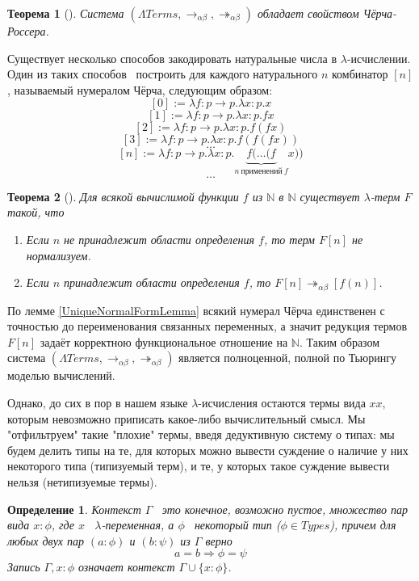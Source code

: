 \documentclass{article}[14pt]
\newtheorem{theorem}{Теорема}
\newtheorem{definition}{Определение}
\newcommand{\dash}{\textemdash\ }
\begin{document}
\begin{theorem}[\cite{SorUrz06}]
    Система $(\Lambda Terms, \rightarrow_{\alpha \beta}, \twoheadrightarrow_{\alpha \beta})$ обладает
    свойством Чёрча-Россера.
\end{theorem}

Существует несколько способов закодировать натуральные числа в $\lambda$-исчислении. Один из таких
способов \dash построить для каждого натурального $n$ комбинатор $[n]$, называемый нумералом Чёрча,
следующим образом:
$$[0] := \lambda f : p \rightarrow p . \lambda x : p . x$$
$$[1] := \lambda f : p \rightarrow p . \lambda x : p . fx$$
$$[2] := \lambda f : p \rightarrow p . \lambda x : p . f (fx)$$
$$[3] := \lambda f : p \rightarrow p . \lambda x : p . f (f (fx))$$
$$ \dots $$
$$[n] := \lambda f : p \rightarrow p. \lambda x : p . \underbrace{f(\dots (f}_{n\ \text{применений}\ f} x))$$
$$ \dots $$

\begin{theorem}[\cite{SorUrz06}]
    Для всякой вычислимой функции $f$ из $\mathbb{N}$ в $\mathbb{N}$ существует
    $\lambda$-терм $F$ такой, что
    \begin{enumerate}
        \item Если $n$ не принадлежит области определения $f$, то терм $F[n]$ не нормализуем.
        \item Если $n$ принадлежит области определения $f$, то $F[n] \twoheadrightarrow_{\alpha \beta} [f(n)]$.
    \end{enumerate}
\end{theorem}

По лемме \ref{UniqueNormalFormLemma} всякий нумерал Чёрча единственен с точностью до переименования
связанных переменных, а значит редукция термов $F[n]$ задаёт корректною функциональное отношение на
$\mathbb{N}$. Таким образом система $(\Lambda Terms, \rightarrow_{\alpha \beta}, \twoheadrightarrow_{\alpha \beta})$
является полноценной, полной по Тьюрингу моделью вычислений.

Однако, до сих в пор в нашем языке $\lambda$-исчисления остаются термы вида $xx$, которым невозможно приписать
какое-либо вычислительный смысл. Мы "отфильтруем" такие "плохие" термы, введя дедуктивную систему о типах:
мы будем делить типы на те, для которых можно вывести суждение о наличие у них некоторого типа (типизуемый терм),
и те, у которых такое суждение вывести нельзя (нетипизуемые термы).

\begin{definition}
    \label{ContextDefinition}
    Контекст $\Gamma$ \dash это конечное, возможно пустое, множество пар вида $x : \phi$, где $x$ \dash $\lambda$-переменная,
    а $\phi$ \dash некоторый тип ($\phi \in Types$), причем для любых двух пар $(a : \phi)$ и $(b : \psi)$ из
    $\Gamma$ верно
    $$a = b \Rightarrow \phi = \psi$$
    Запись $\Gamma, x : \phi$ означает контекст $\Gamma \cup \{x: \phi\}$.
\end{definition}
\end{document}
